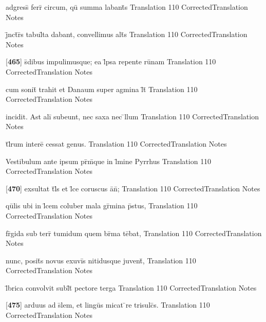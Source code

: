 \latline
  {adgress\={\macron {\i}} ferr\={} circum, qu\={} summa labant\={\macron {\i}}s}
  { Translation }
  {110}
  { CorrectedTranslation }
  { Notes }


\latline
  {j\={}nct\={}r\={}s tabul\={}ta dabant, convellimus alt\={\macron {\i}}s}
  { Translation }
  {110}
  { CorrectedTranslation }
  { Notes }


\latline
  {[\textbf{465}] s\={}dibus impulimusque; ea l\={}psa repente ru\={\macron {\i}}nam}
  { Translation }
  {110}
  { CorrectedTranslation }
  { Notes }


\latline
  {cum sonit\={} trahit et Danaum super agmina l\={}t\={}}
  { Translation }
  {110}
  { CorrectedTranslation }
  { Notes }


\latline
  {incidit. Ast ali\={\macron {\i}} subeunt, nec saxa nec \={}llum }
  { Translation }
  {110}
  { CorrectedTranslation }
  { Notes }


\latline
  {t\={}l\={}rum intere\={} cessat genus.}
  { Translation }
  {110}
  { CorrectedTranslation }
  { Notes }


\latline
  {Vestibulum ante ipsum pr\={\macron {\i}}m\={}que in l\={\macron {\i}}mine Pyrrhus}
  { Translation }
  {110}
  { CorrectedTranslation }
  { Notes }


\latline
  {[\textbf{470}] exsultat t\={}l\={\macron {\i}}s et l\={}ce coruscus a\={}n\={};}
  { Translation }
  {110}
  { CorrectedTranslation }
  { Notes }


\latline
  {qu\={}lis ubi in l\={}cem coluber mala gr\={}mina p\={}stus,}
  { Translation }
  {110}
  { CorrectedTranslation }
  { Notes }


\latline
  {fr\={\macron {\i}}gida sub terr\={} tumidum quem br\={}ma te\={}bat,}
  { Translation }
  {110}
  { CorrectedTranslation }
  { Notes }


\latline
  {nunc, posit\={\macron {\i}}s novus exuvi\={\macron {\i}}s nitidusque juvent\={},}
  { Translation }
  {110}
  { CorrectedTranslation }
  { Notes }


\latline
  {l\={}brica convolvit subl\={}t\={} pectore terga}
  { Translation }
  {110}
  { CorrectedTranslation }
  { Notes }


\latline
  {[\textbf{475}] arduus ad s\={}lem, et lingu\={\macron {\i}}s micat \={}re trisulc\={\macron {\i}}s.}
  { Translation }
  {110}
  { CorrectedTranslation }
  { Notes }


